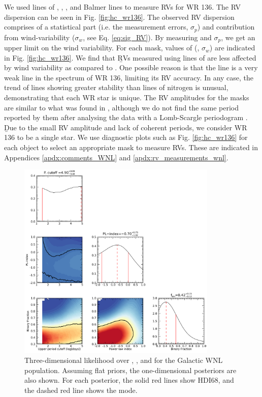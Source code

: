 We used lines of \heii{}, \niii{}, \niv{}, \nv{} and Balmer lines to measure RVs for WR 136. The RV dispersion can be seen in Fig. \ref{fig:hc_wr136}. The observed RV dispersion comprises of a statistical part (i.e. the measurement errors, $\sigma_p$) and contribution from wind-variability ($\sigma_w$, see Eq. \ref{eq:sig_RV}). By measuring \sigRV{} and $\sigma_p$, we get an upper limit on the wind variability. For each mask, values of (\sigRV{}, $\sigma_w$) are indicated in Fig. \ref{fig:hc_wr136}. We find that \b{RVs measured using} lines of \heii{} are less affected by wind variability as compared to \NVred{}. One possible reason is that the \NVred{} line is a very weak line in the spectrum of WR 136, limiting its RV accuracy. In any case, the trend of \heii{} lines showing greater stability than lines of nitrogen is unusual, demonstrating that each WR star is unique. The RV amplitudes for the masks are similar to what was found in \citet{koenigsberger_spectral_1980}, although we do not find the same period reported by them after analysing the data with a Lomb-Scargle periodogram \citep{lomb_least-squares_1976,scargle_studies_1982}. \b{Due to the small RV amplitude and lack of coherent periods, we consider WR 136 to be a single star.} We use diagnostic plots such as Fig. \ref{fig:hc_wr136} for each object to select an appropriate mask to measure RVs. These are indicated in Appendices \ref{apdx:comments_WNL} and \ref{apdx:rv_measurements_wnl}.
\begin{figure}[ht]
    \centering
    \includegraphics[width=0.85\textwidth]{chapters/WNL/image/WNL_May18_4RVbins_stat9.png}
    \caption{Three-dimensional likelihood over \logPmaxWNL{}, \fintWNL{}, and \piWNL{} for the Galactic WNL population. Assuming flat priors, the one-dimensional posteriors are also shown. For each posterior, the solid red lines show HDI68, and the dashed red line shows the mode.}
    \label{fig:posteriors_WNL}
\end{figure}


